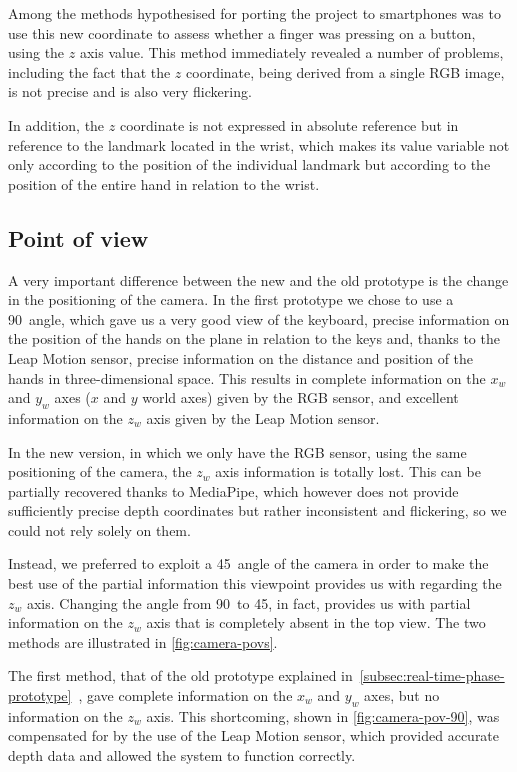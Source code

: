 Among the methods hypothesised for porting the project to smartphones was to use this new coordinate to assess
whether a finger was pressing on a button, using the $z$ axis value.
This method immediately revealed a number of problems, including the fact that the $z$ coordinate,
being derived from a single RGB image, is not precise and is also very flickering.

In addition, the $z$ coordinate is not expressed in absolute reference but in reference to the landmark located in
the wrist, which makes its value variable not only according to the position of the individual landmark
but according to the position of the entire hand in relation to the wrist.

\subsection{Point of view}\label{subsec:pov}
A very important difference between the new and the old prototype is the change in the positioning of the camera.
In the first prototype we chose to use a 90\degree \ angle, which gave us a very good view of the keyboard,
precise information on the position of the hands on the plane in relation to the keys and, thanks
to the Leap Motion sensor, precise information on the distance and position of the hands in three-dimensional space.
This results in complete information on the $x_w$ and $y_w$ axes ($x$ and $y$ world axes) given by the RGB sensor,
and excellent information on the $z_w$ axis given by the Leap Motion sensor.

In the new version, in which we only have the RGB sensor, using the same positioning of the camera,
the $z_w$ axis information is totally lost.
This can be partially recovered thanks to MediaPipe, which however does not provide sufficiently precise
depth coordinates but rather inconsistent and flickering, so we could not rely solely on them.

Instead, we preferred to exploit a 45\degree \ angle of the camera in order to make the best use of the partial
information this viewpoint provides us with regarding the $z_w$ axis.
Changing the angle from 90\degree \ to 45\degree, in fact,
provides us with partial information on the $z_w$ axis that is completely absent in the top view.
The two methods are illustrated in \autoref{fig:camera-povs}.

The first method, that of the old prototype explained
in~\autoref{subsec:real-time-phase-prototype}~,
gave complete information on the $x_w$ and $y_w$ axes, but no information on the $z_w$ axis.
This shortcoming, shown in \autoref{fig:camera-pov-90}, was compensated for by the use of the Leap Motion sensor,
which provided accurate depth data and allowed the system to function correctly.

